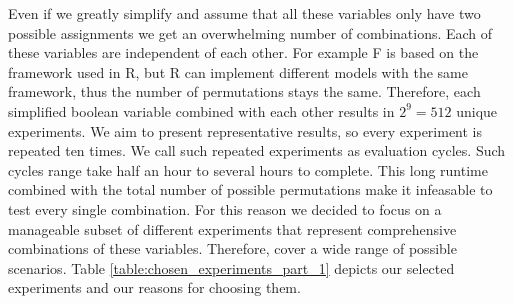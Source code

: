 Even if we greatly simplify and assume that all these variables only have two possible assignments we get an overwhelming number of combinations.
Each of these variables are independent of each other.
For example F is based on the framework used in R, but R can implement different models with the same framework, thus the number of permutations stays the same.
Therefore, each simplified boolean variable combined with each other results in $ 2^9 = 512$ unique experiments.
We aim to present representative results, so every experiment is repeated ten times.
We call such repeated experiments as evaluation cycles.
Such cycles range take half an hour to several hours to complete.
This long runtime combined with the total number of possible permutations make it infeasable to test every single combination.
For this reason we decided to focus on a manageable subset of different experiments that represent comprehensive combinations of these variables.
Therefore, cover a wide range of possible scenarios.
Table \ref{table:chosen_experiments_part_1} depicts our selected experiments and our reasons for choosing them.

\begin{figure}[p]
    
\end{figure}

\begin{figure}[p]
    
\end{figure}